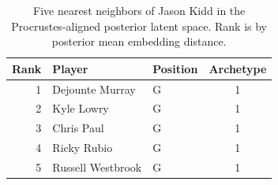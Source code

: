 \begin{table}[htbp]
  \centering\small
  \begin{tabular}{rllc}
    \toprule
    Rank & Player & Position & Archetype \\
    \midrule
    1 & Dejounte Murray & G & 1 \\
    2 & Kyle Lowry & G & 1 \\
    3 & Chris Paul & G & 1 \\
    4 & Ricky Rubio & G & 1 \\
    5 & Russell Westbrook & G & 1 \\
    \bottomrule
  \end{tabular}
  \caption{Five nearest neighbors of Jason Kidd in the Procrustes-aligned posterior latent space. Rank is by posterior mean embedding distance.}
  \label{tab:Jason_Kidd_neighbors}
\end{table}


